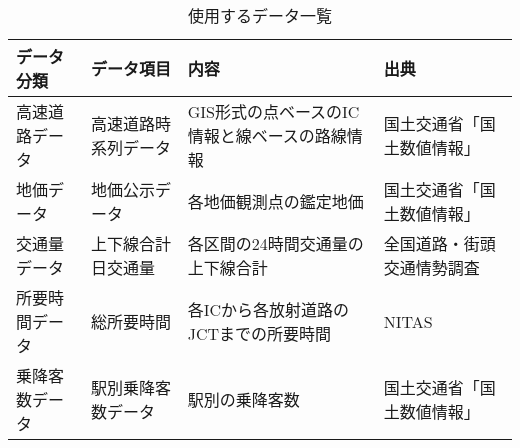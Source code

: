 \begin{table}[h!]
  \centering
  \renewcommand{\arraystretch}{1.2} %
  \begin{tabularx}{\textwidth}{p{} p{} p{} X}
  \toprule
  \textbf{データ分類}     &\textbf{データ項目}         & \textbf{内容}                                    & \textbf{出典}                   \\
  \midrule
  高速道路データ          &高速道路時系列データ         & GIS形式の点ベースのIC情報と線ベースの路線情報           & 国土交通省「国土数値情報」    \\
  地価データ             &地価公示データ              & 各地価観測点の鑑定地価                                & 国土交通省「国土数値情報」    \\
  交通量データ            &上下線合計日交通量           & 各区間の24時間交通量の上下線合計                       & 全国道路・街頭交通情勢調査              \\
  所要時間データ          &総所要時間                  & 各ICから各放射道路のJCTまでの所要時間                   & NITAS            \\
  乗降客数データ          &駅別乗降客数データ           &駅別の乗降客数                                         &国土交通省「国土数値情報」\\
  \bottomrule
  \end{tabularx}
  \caption{使用するデータ一覧}
  \label{data_list}
  \end{table}
  

